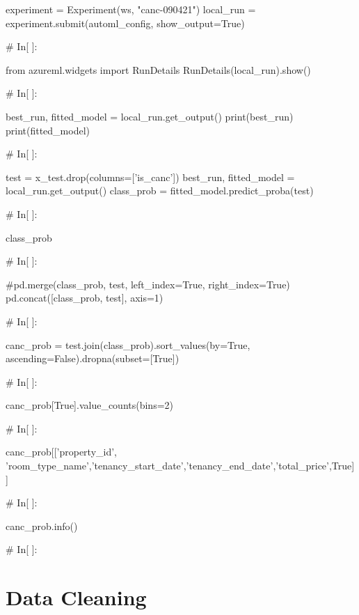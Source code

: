 \begin{python}
experiment = Experiment(ws, "canc-090421")
local_run = experiment.submit(automl_config, show_output=True)


# In[ ]:


from azureml.widgets import RunDetails
RunDetails(local_run).show()


# In[ ]:


best_run, fitted_model = local_run.get_output()
print(best_run)
print(fitted_model)


# In[ ]:


test = x_test.drop(columns=['is_canc'])
best_run, fitted_model = local_run.get_output()
class_prob = fitted_model.predict_proba(test)


# In[ ]:


class_prob


# In[ ]:


#pd.merge(class_prob, test, left_index=True, right_index=True)
pd.concat([class_prob, test], axis=1)


# In[ ]:


canc_prob = test.join(class_prob).sort_values(by=True, ascending=False).dropna(subset=[True])


# In[ ]:


canc_prob[True].value_counts(bins=2)


# In[ ]:


canc_prob[['property_id', 'room_type_name','tenancy_start_date','tenancy_end_date','total_price',True]]


# In[ ]:


canc_prob.info()


# In[ ]:
\end{python}

\section{Data Cleaning}

